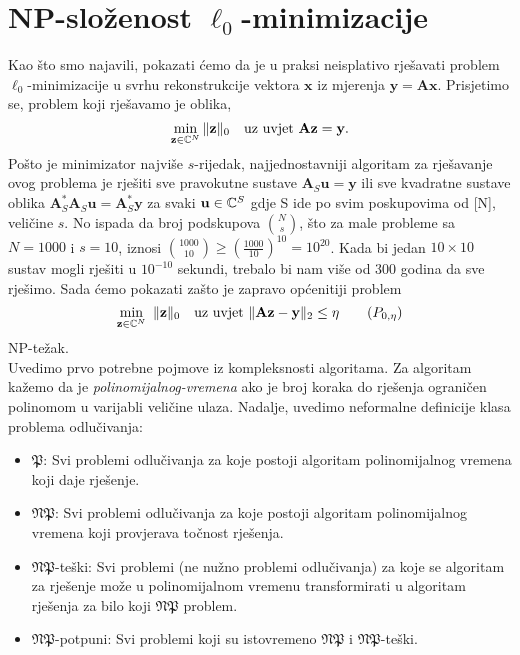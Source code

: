 \documentclass[a4paper,twoside,12pt]{memoir} %
\newcommand{\vect}[1]{\mathbf{#1}}
\renewcommand{\vec}{\vect}
\newcommand{\norm}[1]{\|{#1}\|}
\begin{document}
\section[NP-slo\v{z}enost $\mathbf{\ell_0}$-minimizacije][NP-slo\v{z}enost $\ell_0$-minimizacije]{NP-slo\v{z}enost $\ell_0$-minimizacije}
Kao \v{s}to smo najavili, pokazati \'cemo da je u praksi neisplativo rje\v{s}avati problem $\ell_0$-minimizacije u svrhu rekonstrukcije vektora $\vec x$ iz mjerenja $\vec y = \vec{Ax}$. Prisjetimo se, problem koji rje\v{s}avamo je oblika, 
\begin{equation*}
    \min_{\vec z \in \C^N} \norm{\vec z}_0 \quad \text{uz uvjet } \vec{Az}=\vec y. 
\end{equation*}
Po\v{s}to je minimizator najvi\v{s}e $s$-rijedak, najjednostavniji algoritam za rje\v{s}avanje ovog problema je rje\v{s}iti sve pravokutne sustave $\vec A_S \vec u = \vec y$ ili sve kvadratne sustave oblika $\vec A_S^* \vec A_S \vec u = \vec A_S^* \vec y$ za svaki $\vec u \in \C^S$ gdje S ide po svim poskupovima od [N], veli\v{c}ine $s$. No ispada da broj podskupova $N \choose s$, \v{s}to za male probleme sa $N = 1000$ i $s=10$, iznosi ${1000 \choose 10} \geq (\frac{1000}{10})^{10}=10^{20}$. Kada bi jedan $10 \times 10$ sustav mogli rje\v{s}iti u $10^{-10}$ sekundi, trebalo bi nam vi\v{s}e od 300 godina da sve rje\v{s}imo. Sada \'cemo pokazati za\v{s}to je zapravo op\'cenitiji problem
\begin{equation}
\min_{\vec z \in \C^N}\ \norm{\vec z}_0 \quad \text{uz uvjet }\norm{\vec{Az}- \vec{y}}_2 \leq \eta \tag{$P_{0, \eta}$}\label{problem_minimizacije_generalni}
\end{equation}
NP-te\v{z}ak.\\
\indent Uvedimo prvo potrebne pojmove iz kompleksnosti algoritama. Za algoritam ka\v{z}emo da je \textit{polinomijalnog-vremena} ako je broj koraka do rje\v{s}enja ograni\v{c}en polinomom u varijabli veli\v{c}ine ulaza. Nadalje, uvedimo neformalne definicije klasa problema odlu\v{c}ivanja:
\begin{itemize}
    \item $\mathfrak{P}$: Svi problemi odlu\v{c}ivanja za koje postoji algoritam polinomijalnog vremena koji daje rje\v{s}enje.
    \item $\mathfrak{NP}$: Svi problemi odlu\v{c}ivanja za koje postoji algoritam polinomijalnog vremena koji provjerava to\v{c}nost rje\v{s}enja.
    \item $\mathfrak{NP}$-te\v{s}ki: Svi problemi (ne nu\v{z}no problemi odlu\v{c}ivanja) za koje se algoritam za rje\v{s}enje mo\v{z}e u polinomijalnom vremenu transformirati u algoritam rje\v{s}enja za bilo koji $\mathfrak{NP}$ problem.
    \item $\mathfrak{NP}$-potpuni: Svi problemi koji su istovremeno $\mathfrak{NP}$ i $\mathfrak{NP}$-te\v{s}ki.
\end{itemize}
\end{document}
